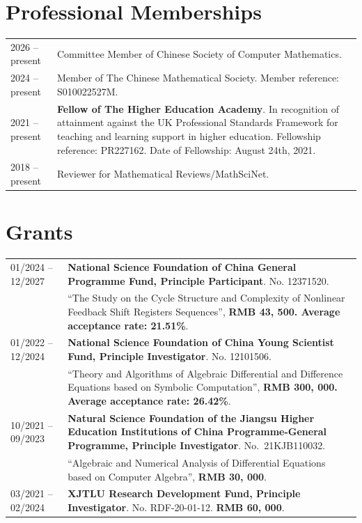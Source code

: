 \documentclass[a4paper,12pt]{article}
\begin{document}
\section*{\Large{Professional Memberships}}
\begin{tabular}{@{}p{1.4in}p{4.5in}} 
2026 -- present & Committee Member of Chinese Society of Computer Mathematics. \\
2024 -- present &  Member of The Chinese Mathematical Society.  Member reference: S010022527M. \\
2021 -- present & \textbf{Fellow of The Higher Education Academy}. 
In recognition of attainment against the UK
Professional Standards Framework for teaching and learning support in higher education.
Fellowship reference: PR227162. Date of Fellowship: August 24th, 2021. \\
2018 -- present &  Reviewer for Mathematical Reviews/MathSciNet.            
\end{tabular}

\section*{\Large{Grants}}
\begin{tabular}{@{}p{1.4in}p{4.5in}}
01/2024 -- 12/2027 &\textbf{National Science Foundation of China General Programme Fund, Principle Participant}. No. 12371520. \\
                                 & ``The Study on the Cycle Structure and Complexity of Nonlinear Feedback Shift Registers Sequences'',
                                  \textbf{RMB 43, 500. Average acceptance rate: 21.51\%}. \\
01/2022 -- 12/2024 & \textbf{National Science Foundation of China Young Scientist Fund, Principle Investigator}. No. 12101506.  \\
                                 & ``Theory and Algorithms of Algebraic Differential and Difference Equations based on Symbolic Computation'',
                                 \textbf{RMB 300, 000. Average acceptance rate: 26.42\%}.\\
10/2021 -- 09/2023 & \textbf{Natural Science Foundation of the Jiangsu Higher Education Institutions of China Programme-General Programme, 
                                       Principle Investigator}. No.\ 21KJB110032. \\
                                   & ``Algebraic and Numerical Analysis of Differential Equations based on Computer Algebra'', \textbf{RMB 30, 000}.  \\     
03/2021 -- 02/2024    & \textbf{XJTLU Research Development Fund, Principle Investigator}. No. RDF-20-01-12. \textbf{RMB 60, 000}. 
\end{tabular}
\end{document}
